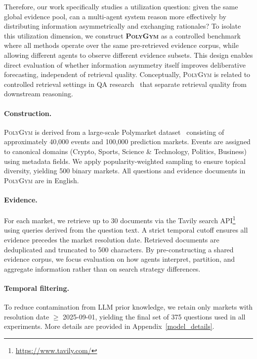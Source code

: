 \documentclass[11pt]{article}
\theoremstyle{plain}
\theoremstyle{definition}
\begin{document}
Therefore, our work specifically studies a utilization question:
given the same global evidence pool, can a multi-agent system reason more effectively by distributing information asymmetrically and exchanging rationales?
To isolate this utilization dimension, we construct \textbf{\textsc{PolyGym}} as a controlled benchmark where all methods operate over the same pre-retrieved evidence corpus, while allowing different agents to observe different evidence subsets.
This design enables direct evaluation of whether information asymmetry itself improves deliberative forecasting, independent of retrieval quality.
Conceptually, \textsc{PolyGym} is related to controlled retrieval settings in QA research~\citep{chen2021finqa,yang2018hotpotqa} that separate retrieval quality from downstream reasoning.

\paragraph{Construction.}
\textsc{PolyGym} is derived from a large-scale Polymarket dataset~\citep{kaggle_polymarket_dataset} consisting of approximately 40,000 events and 100,000 prediction markets.
Events are assigned to canonical domains (Crypto, Sports, Science \& Technology, Politics, Business) using metadata fields.
We apply popularity-weighted sampling to ensure topical diversity, yielding 500 binary markets. All questions and evidence documents in \textsc{PolyGym} are in English.

\paragraph{Evidence.}
For each market, we retrieve up to 30 documents via the Tavily search API\footnote{\url{https://www.tavily.com/}} using queries derived from the question text.
A strict temporal cutoff ensures all evidence precedes the market resolution date.
Retrieved documents are deduplicated and truncated to 500 characters.
By pre-constructing a shared evidence corpus, we focus evaluation on how agents interpret, partition, and aggregate information rather than on search strategy differences.



\paragraph{Temporal filtering.}
To reduce contamination from LLM prior knowledge, we retain only markets with resolution date $\geq$ 2025-09-01, yielding the final set of 375 questions used in all experiments. More details are provided in Appendix~\ref{model_details}.
\end{document}
